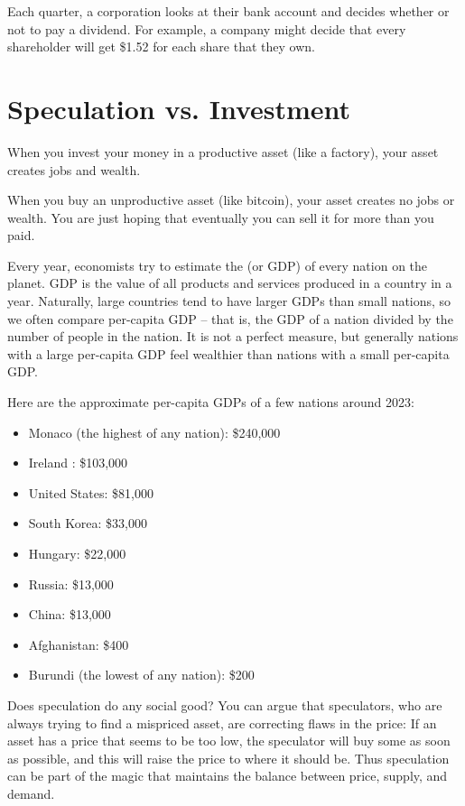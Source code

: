 Each quarter, a corporation looks at their bank account and decides whether or not to pay a dividend. For example, a company might decide that every shareholder will get \$1.52 for each share that they own.

\section{Speculation vs. Investment}

When you invest your money in a productive asset (like a factory), your asset creates jobs and wealth.

When you buy an unproductive asset (like bitcoin), your asset creates no jobs or wealth.  You are just hoping that eventually you can sell it for more than you paid.

Every year, economists try to estimate the  (or GDP) of every nation on the planet.  GDP is the value of all products and services produced in a country in a year. Naturally, large countries tend to have larger GDPs than small nations, so we often compare per-capita GDP -- that is, the GDP of a nation divided by the number of people in the nation.  It is not a perfect measure, but generally nations with a large per-capita GDP feel wealthier than nations with a small per-capita GDP.

Here are the approximate per-capita GDPs of a few nations around 2023:
\begin{itemize}
\item Monaco (the highest of any nation): \$240,000
\item Ireland : \$103,000
\item United States: \$81,000
\item South Korea: \$33,000
\item Hungary: \$22,000
\item Russia: \$13,000
\item China: \$13,000
\item Afghanistan: \$400
\item Burundi (the lowest of any nation): \$200
\end{itemize}

Does speculation do any social good? You can argue that speculators, who are always trying to find a mispriced asset, are correcting flaws in the price: If an asset has a price that seems to be too low, the speculator will buy some as soon as possible, and this will raise the price to where it should be. Thus speculation can be part of the magic that maintains the balance between price, supply, and demand.

